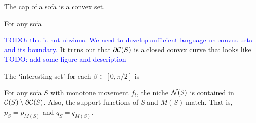 The cap of a sofa is a convex set.  
\begin{lemma}

\end{lemma}

\begin{theorem}
For any sofa 
\end{theorem}

\textcolor{blue}{TODO: this is not obvious. We need to develop sufficient language on convex sets and its boundary.}
It turns out that $\partial \mathcal{C}(S)$ is a closed convex curve that looks like \textcolor{blue}{TODO: add some figure and description}

The `interesting set' for each $\beta \in [0, \pi/2]$ is 

\begin{theorem}
\label{thm:monotone-sofa-structure}
For any sofa $S$ with monotone movement $f_t$, the niche $\mathcal{N}(S)$ is contained in $\mathcal{C}(S) \setminus \partial \mathcal{C}(S)$.
Also, the support functions of $S$ and $M(S)$ match. That is, $p_S = p_{M(S)}$ and $q_S = q_{M(S)}$.
\end{theorem}
